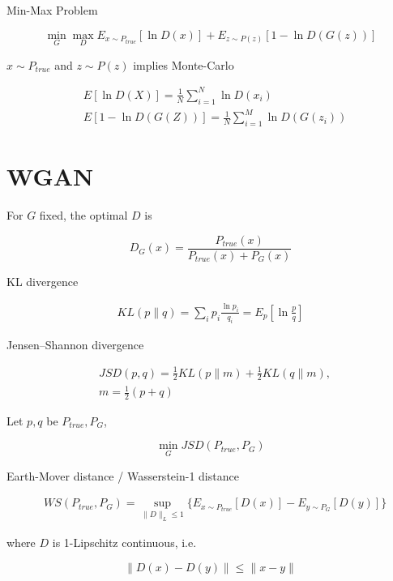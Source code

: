 \documentclass{article}
\begin{document}
        Min-Max Problem

        \begin{equation*}\label{ce-gan}
            \min_{G} \max_{D} E_{ x \sim P_{true} }[ \ln D(x) ] + E_{ z \sim P(z) }[ 1 - \ln
            D(G(z)) ]
        \end{equation*}

        $ x \sim P_{true} $ and $ z \sim P(z) $ implies Monte-Carlo

        \begin{align*}
            & E[ \ln D(X) ] = \frac{1}{N}\sum_{ i = 1 }^N \ln D(x_i) \\
            & E[ 1 - \ln D(G(Z)) ] = \frac{1}{N}\sum_{ i = 1 }^M \ln D(G(z_i))
        \end{align*}
            

    \section*{WGAN}

        For $ G $ fixed, the optimal $ D $ is

        \begin{equation*}
            D_G (x) = \frac{ P_{true}(x) }{ P_{true} (x) + P_{G} (x)}
        \end{equation*}

        KL divergence

        \begin{align*}
            KL(p \| q) = \sum_{i} p_{i} \frac{ \ln p_{i}}{ q_{i} } = E_{p} [ \ln \frac{p}{q} ]
        \end{align*}

        Jensen–Shannon divergence

        \begin{align*}
            & JSD(p, q) =  \frac{1}{2} KL(p \| m) + \frac{1}{2} KL(q \| m), \\
            & m = \frac{1}{2} ( p + q)
        \end{align*}

        Let $ p, q $ be $ P_{true}, P_{G}$,

        \begin{equation*}
            \min_{G} JSD( P_{true}, P_{G})
        \end{equation*}

        Earth-Mover distance / Wasserstein-1 distance

        \begin{align*}
           & WS( P_{true}, P_{G} ) = \sup_{ \| D \|_{L} \leq 1 } \{ E_{x \sim
           P_{true} }[D(x)] - E_{ y \sim P_{G} }[D(y)] \}
        \end{align*}

        where $ D $ is 1-Lipschitz continuous, i.e.

        \begin{equation}
            \| D(x) - D(y) \| \leq \| x - y \|
        \end{equation}
        
    
\end{document}
